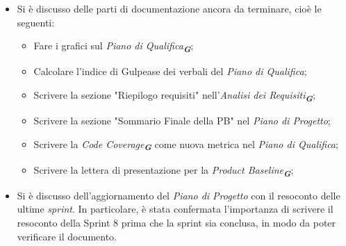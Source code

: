 \begin{itemize}
    \item Si è discusso delle parti di documentazione ancora da terminare, cioè le seguenti:
        \begin{itemize}
            \item Fare i grafici sul \emph{Piano di Qualifica}\textsubscript{\textit{\textbf{G}}};
            \item Calcolare l'indice di Gulpease dei verbali del \emph{Piano di Qualifica};
            \item Scrivere la sezione "Riepilogo requisiti" nell'\emph{Analisi dei Requisiti}\textsubscript{\textit{\textbf{G}}};
            \item Scrivere la sezione "Sommario Finale della PB" nel \emph{Piano di Progetto};
            \item Scrivere la \emph{Code Coverage}\textsubscript{\textit{\textbf{G}}} come nuova metrica nel \emph{Piano di Qualifica};
            \item Scrivere la lettera di presentazione per la \emph{Product Baseline}\textsubscript{\textit{\textbf{G}}};
        \end{itemize}
    
        \item Si è discusso dell'aggiornamento del \emph{Piano di Progetto} con il resoconto delle ultime \emph{sprint}. In particolare, è stata confermata l'importanza di scrivere il resoconto della Sprint 8 prima che la sprint sia conclusa, in modo da poter verificare il documento.
    
\end{itemize}
